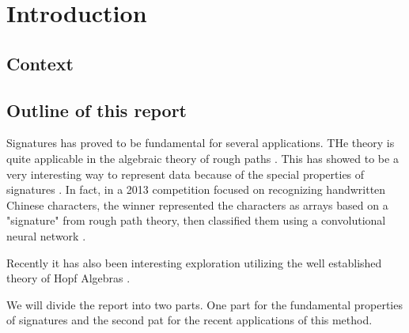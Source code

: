 \section{Introduction}\label{sec:introduction}

\subsection{Context}%
\label{sub:context}




\subsection{Outline of this report}%
\label{sub:outline_of_this_report}

Signatures has proved to be fundamental for several applications.
THe theory is quite applicable in the algebraic theory of rough paths \cite{geng2021introduction}. This has showed to be a very interesting way to represent data because of the special properties of signatures \cite{chevyrev2016primer}. In fact, in a 2013 competition focused on recognizing handwritten Chinese characters, the winner represented the characters as arrays based on a "signature" from rough path theory, then classified them using a convolutional neural network \cite{yin2013icdar}.

Recently it has also been interesting exploration utilizing the well established theory of Hopf Algebras \cite{preiss2021hopf}.



We will divide the report into two parts. One part for the fundamental properties of signatures and the second pat for the recent applications of this method.




